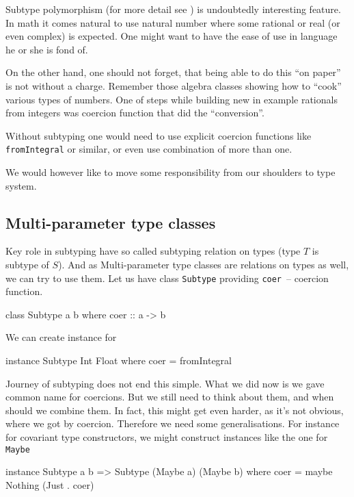 \documentclass[11pt,oneside,draft]{fithesis2}
\newcommand\uv[1]{``#1''}
\theoremstyle{definition}
\begin{document}
Subtype polymorphism (for more detail see \cite{pierce:2002:types})
is undoubtedly interesting feature. In math it comes natural to use
natural number where some rational or real (or even complex) is expected.
%
One might want to have the ease of use in language
he or she is fond of.

On the other hand, one should not forget, that being
able to do this \uv{on paper} is not without a charge.
Remember those algebra classes showing how to \uv{cook}
various types of numbers. One of steps while building
new in example rationals from integers was
coercion function that did the \uv{conversion}.

Without subtyping one would need to use explicit
coercion functions like \texttt{fromIntegral} or
similar, or even use combination of more than one.

We would however like to move some responsibility
from our shoulders to type system.

\subsection{Multi-parameter type classes}

Key role in subtyping have so called subtyping relation
on types (type \(T\) is subtype of \(S\)).
And as Multi-parameter type classes are relations on types as well,
we can try to use them. Let us have class \texttt{Subtype} providing
\texttt{coer}~-- coercion function.

\begin{code}
class Subtype a b where
    coer :: a -> b
\end{code}

We can create instance for

\begin{code}
instance Subtype Int Float where
    coer = fromIntegral
\end{code}

Journey of subtyping does not end this simple. What we did now
is we gave common name for coercions. But we still need to
think about them, and when should we combine them.
In fact, this might get even harder, as it's not
obvious, where we got by coercion. Therefore we need
some generalisations. For instance for covariant type
constructors, we might construct instances like the
one for \texttt{Maybe}

\begin{code}
instance Subtype a b => Subtype (Maybe a) (Maybe b) where
    coer = maybe Nothing (Just . coer)
\end{code}
\end{document}
